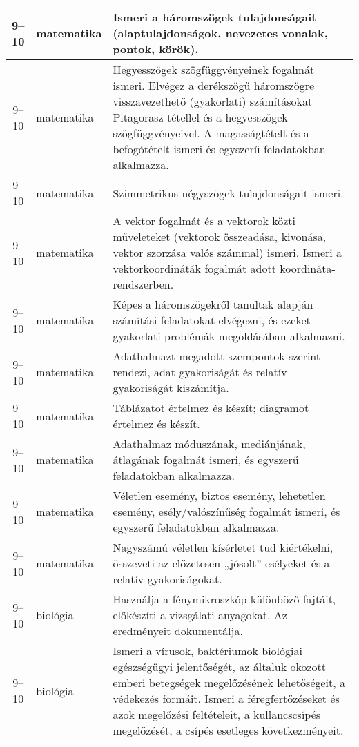 \begin{small}
\begin{longtable}{c | p{2cm} |  p{11cm} }
              9--10 & matematika & Ismeri a háromszögek tulajdonságait (alaptulajdonságok, nevezetes vonalak, pontok, körök). \\ \hline
              9--10 & matematika & Hegyesszögek szögfüggvényeinek fogalmát ismeri.
Elvégez a derékszögű háromszögre visszavezethető (gyakorlati) számításokat Pitagorasz-tétellel és a hegyesszögek szögfüggvényeivel. A magasságtételt és a befogótételt ismeri és egyszerű feladatokban alkalmazza. \\ \hline
              9--10 & matematika & Szimmetrikus négyszögek tulajdonságait ismeri. \\ \hline
              9--10 & matematika & A vektor fogalmát és a vektorok közti műveleteket (vektorok összeadása, kivonása, vektor szorzása valós számmal) ismeri. Ismeri a vektorkoordináták fogalmát adott koordináta-rendszerben. \\ \hline
              9--10 & matematika & Képes a háromszögekről tanultak alapján számítási feladatokat elvégezni, és ezeket gyakorlati problémák megoldásában alkalmazni. \\ \hline
              9--10 & matematika & Adathalmazt megadott szempontok szerint rendezi, adat gyakoriságát és relatív gyakoriságát kiszámítja. \\ \hline
              9--10 & matematika & Táblázatot értelmez és készít; diagramot értelmez és készít. \\ \hline
              9--10 & matematika & Adathalmaz móduszának, mediánjának, átlagának fogalmát ismeri, és egyszerű feladatokban alkalmazza. \\ \hline
              9--10 & matematika & Véletlen esemény, biztos esemény, lehetetlen esemény, esély/valószínűség fogalmát ismeri, és egyszerű feladatokban alkalmazza. \\ \hline
              9--10 & matematika & Nagyszámú véletlen kísérletet tud kiértékelni, összeveti az előzetesen „jósolt” esélyeket és a relatív gyakoriságokat. \\ \hline
              9--10 & biológia & Használja a fénymikroszkóp különböző fajtáit, előkészíti a vizsgálati anyagokat. Az eredményeit dokumentálja. \\ \hline
              9--10 & biológia & Ismeri a vírusok, baktériumok biológiai egészségügyi jelentőségét, az általuk okozott emberi betegségek megelőzésének lehetőségeit, a védekezés formáit. Ismeri a féregfertőzéseket és azok megelőzési feltételeit, a kullancscsípés megelőzését, a csípés esetleges következményeit. \\ \hline

\end{longtable}
\end{small}
